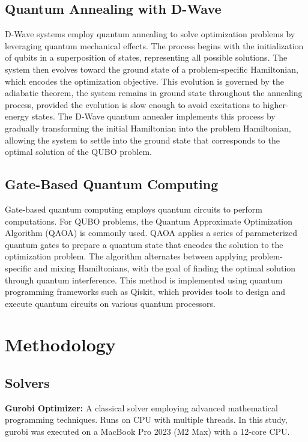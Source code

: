 \documentclass[conference]{IEEEtran}
\begin{document}
\subsection{Quantum Annealing with D-Wave}
D-Wave systems employ quantum annealing to solve optimization problems by leveraging quantum mechanical effects. 
The process begins with the initialization of qubits in a superposition of states, representing all possible solutions. 
The system then evolves toward the ground state of a problem-specific Hamiltonian, which encodes the optimization objective. 
This evolution is governed by the adiabatic theorem, the system remains in ground state throughout the annealing process, provided the evolution is slow enough to avoid excitations to higher-energy states. The D-Wave quantum annealer implements this process by gradually transforming the initial Hamiltonian into the problem Hamiltonian, allowing the system to settle into the ground state that corresponds to the optimal solution of the QUBO problem. 

\subsection{Gate-Based Quantum Computing}
Gate-based quantum computing employs quantum circuits to perform computations. For QUBO problems, the Quantum Approximate Optimization Algorithm (QAOA) is commonly used. 
QAOA applies a series of parameterized quantum gates to prepare a quantum state that encodes the solution to the optimization problem. 
The algorithm alternates between applying problem-specific and mixing Hamiltonians, with the goal of finding the optimal solution through quantum interference. 
This method is implemented using quantum programming frameworks such as Qiskit, which provides tools to design and execute quantum circuits on various quantum processors.


\section{Methodology}

\subsection{Solvers}

\textbf{Gurobi Optimizer:} A classical solver employing advanced mathematical programming techniques. Runs on CPU with multiple threads. In this study, gurobi was executed on a MacBook Pro 2023 (M2 Max) with a 12-core CPU.
\end{document}
